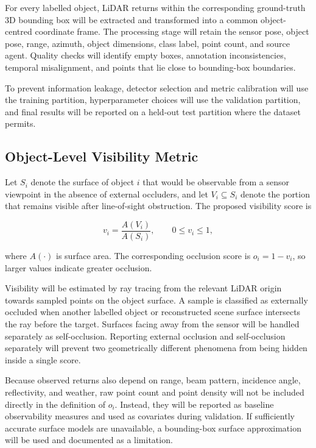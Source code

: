 For every labelled object, LiDAR returns within the corresponding ground-truth 3D bounding box will be extracted and transformed into a common object-centred coordinate frame. The processing stage will retain the sensor pose, object pose, range, azimuth, object dimensions, class label, point count, and source agent. Quality checks will identify empty boxes, annotation inconsistencies, temporal misalignment, and points that lie close to bounding-box boundaries.

To prevent information leakage, detector selection and metric calibration will use the training partition, hyperparameter choices will use the validation partition, and final results will be reported on a held-out test partition where the dataset permits.

\subsection{Object-Level Visibility Metric}

Let $S_i$ denote the surface of object $i$ that would be observable from a sensor viewpoint in the absence of external occluders, and let $V_i \subseteq S_i$ denote the portion that remains visible after line-of-sight obstruction. The proposed visibility score is

\begin{equation}
    v_i = \frac{A(V_i)}{A(S_i)},
    \qquad 0 \leq v_i \leq 1,
\end{equation}

where $A(\cdot)$ is surface area. The corresponding occlusion score is $o_i = 1-v_i$, so larger values indicate greater occlusion.

Visibility will be estimated by ray tracing from the relevant LiDAR origin towards sampled points on the object surface. A sample is classified as externally occluded when another labelled object or reconstructed scene surface intersects the ray before the target. Surfaces facing away from the sensor will be handled separately as self-occlusion. Reporting external occlusion and self-occlusion separately will prevent two geometrically different phenomena from being hidden inside a single score.

Because observed returns also depend on range, beam pattern, incidence angle, reflectivity, and weather, raw point count and point density will not be included directly in the definition of $o_i$. Instead, they will be reported as baseline observability measures and used as covariates during validation. If sufficiently accurate surface models are unavailable, a bounding-box surface approximation will be used and documented as a limitation.

